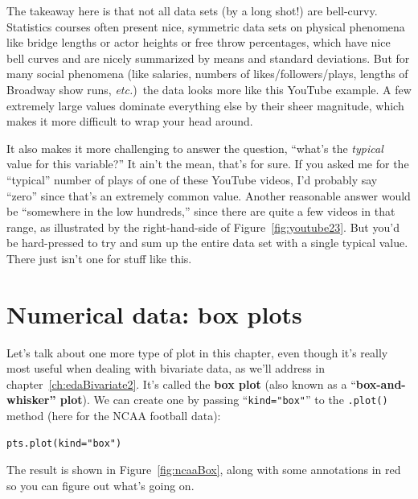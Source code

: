 
The takeaway here is that not all data sets (by a long shot!) are bell-curvy.
Statistics courses often present nice, symmetric data sets on physical
phenomena like bridge lengths or actor heights or free throw percentages, which
have nice bell curves and are nicely summarized by means and standard
deviations. But for many social phenomena (like salaries, numbers of
likes/followers/plays, lengths of Broadway show runs, \textit{etc.})~the data
looks more like this YouTube example. A few extremely large values dominate
everything else by their sheer magnitude, which makes it more difficult to wrap
your head around.

It also makes it more challenging to answer the question, ``what's the
\textit{typical} value for this variable?'' It ain't the mean, that's for sure.
If you asked me for the ``typical'' number of plays of one of these YouTube
videos, I'd probably say ``zero'' since that's an extremely common value.
Another reasonable answer would be ``somewhere in the low hundreds,'' since
there are quite a few videos in that range, as illustrated by the
right-hand-side of Figure~\ref{fig:youtube23}. But you'd be hard-pressed to try
and sum up the entire data set with a single typical value. There just isn't
one for stuff like this.

\section{Numerical data: box plots}


Let's talk about one more type of plot in this chapter, even though it's really
most useful when dealing with bivariate data, as we'll address in
chapter~\ref{ch:edaBivariate2}. It's called the \textbf{box plot} (also known
as a ``\textbf{box-and-whisker'' plot}). We can create one by passing
``\texttt{kind="box"}'' to the \texttt{.plot()} method (here for the NCAA
football data):

\begin{Verbatim}[fontsize=\small,samepage=true,frame=single,framesep=3mm]
pts.plot(kind="box")
\end{Verbatim}

\label{interpretingBoxPlots}

The result is shown in Figure~\ref{fig:ncaaBox}, along with some annotations in
red so you can figure out what's going on.

